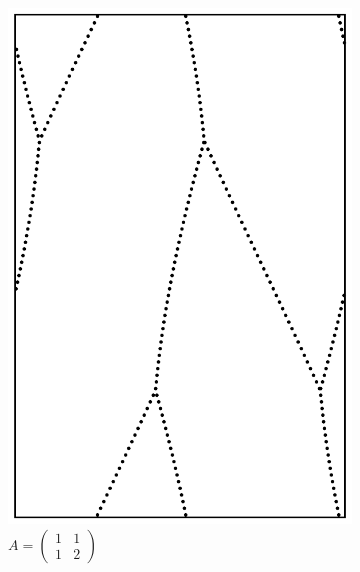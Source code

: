 \documentclass[12pt,twoside]{reedthesis}
\theoremstyle{definition}
\begin{document}
\begin{figure}[h]
  \centering
  \begin{subfigure}[t]{0.31\textwidth}
    \centering
    \includegraphics[width=\textwidth]{figures/subset_loop_qp_1_1_1_2.pdf}
    \caption*{$A = \begin{pmatrix}1 & 1 \\ 1 & 2\end{pmatrix}$}
  \end{subfigure}
  \hfill
  \begin{subfigure}[t]{0.31\textwidth}
    \centering

\end{subfigure}
\end{figure}
\end{document}
